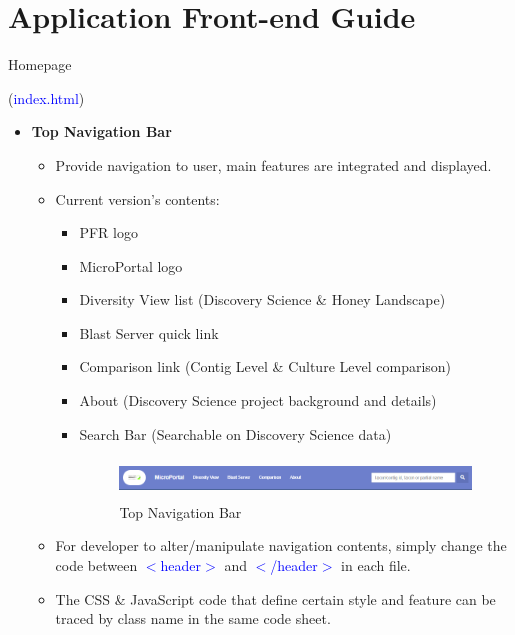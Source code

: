 \documentclass{scrreprt}
\begin{document}
\section{Application Front-end Guide}
\begin{enumerate}
{\Large \item Homepage} (\textcolor{blue}{index.html})
\begin{itemize}
\item \begin{large}\textbf{Top Navigation Bar}\end{large}
\begin{itemize}
    \item Provide navigation to user, main features are integrated and displayed.
    \item Current version's contents:
    \begin{itemize}
        \item PFR logo
        \item MicroPortal logo
        \item Diversity View list (Discovery Science \& Honey Landscape)
        \item Blast Server quick link
        \item Comparison link (Contig Level \& Culture Level comparison)
        \item About (Discovery Science project background and details)
        \item Search Bar (Searchable on Discovery Science data)
    \begin{figure}[h!]
    \centering
    \includegraphics[width=15cm,height=30pt]{Navbar.PNG}
    \caption{Top Navigation Bar}
    \label{fig:Start Tour}
\end{figure}
    \end{itemize}
    \item For developer to alter/manipulate navigation contents, simply change the code between 
      \textcolor{blue}{$<$header$>$} and \textcolor{blue}{$<$/header$>$} in each file.
     \item The CSS \& JavaScript code that define certain style and feature can be traced by class name in the same code sheet.
     \newline
\end{itemize}


\end{itemize}
\end{enumerate}
\end{document}
